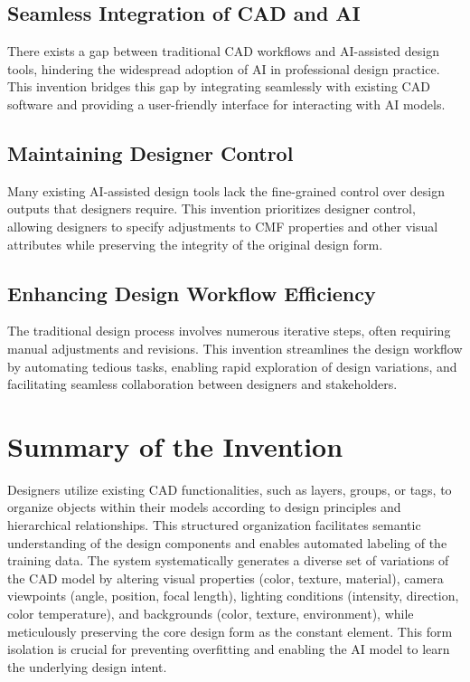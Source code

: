 \documentclass{article}
\begin{document}
\subsection{Seamless Integration of CAD and AI}
There exists a gap between traditional CAD workflows and AI-assisted design tools, hindering the widespread adoption of AI in professional design practice. This invention bridges this gap by integrating seamlessly with existing CAD software and providing a user-friendly interface for interacting with AI models.

\subsection{Maintaining Designer Control}
Many existing AI-assisted design tools lack the fine-grained control over design outputs that designers require. This invention prioritizes designer control, allowing designers to specify adjustments to CMF properties and other visual attributes while preserving the integrity of the original design form.

\subsection{Enhancing Design Workflow Efficiency}
The traditional design process involves numerous iterative steps, often requiring manual adjustments and revisions. This invention streamlines the design workflow by automating tedious tasks, enabling rapid exploration of design variations, and facilitating seamless collaboration between designers and stakeholders.


\section{Summary of the Invention}

Designers utilize existing CAD functionalities, such as layers, groups, or tags, to organize objects within their models according to design principles and hierarchical relationships. This structured organization facilitates semantic understanding of the design components and enables automated labeling of the training data. The system systematically generates a diverse set of variations of the CAD model by altering visual properties (color, texture, material), camera viewpoints (angle, position, focal length), lighting conditions (intensity, direction, color temperature), and backgrounds (color, texture, environment), while meticulously preserving the core design form as the constant element. This form isolation is crucial for preventing overfitting and enabling the AI model to learn the underlying design intent.
\end{document}

